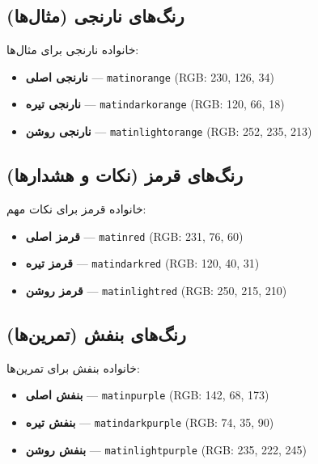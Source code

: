 \documentclass{matinbook}
\begin{document}
\subsection{رنگ‌های نارنجی (مثال‌ها)}

خانواده نارنجی برای مثال‌ها:

\begin{itemize}
    \item \textcolor{matinorange}{\textbf{نارنجی اصلی}} --- \texttt{matinorange} (RGB: 230, 126, 34)
    \item \textcolor{matindarkorange}{\textbf{نارنجی تیره}} --- \texttt{matindarkorange} (RGB: 120, 66, 18)
    \item \colorbox{matinlightorange}{\textbf{نارنجی روشن}} --- \texttt{matinlightorange} (RGB: 252, 235, 213)
\end{itemize}

\subsection{رنگ‌های قرمز (نکات و هشدارها)}

خانواده قرمز برای نکات مهم:

\begin{itemize}
    \item \textcolor{matinred}{\textbf{قرمز اصلی}} --- \texttt{matinred} (RGB: 231, 76, 60)
    \item \textcolor{matindarkred}{\textbf{قرمز تیره}} --- \texttt{matindarkred} (RGB: 120, 40, 31)
    \item \colorbox{matinlightred}{\textbf{قرمز روشن}} --- \texttt{matinlightred} (RGB: 250, 215, 210)
\end{itemize}

\subsection{رنگ‌های بنفش (تمرین‌ها)}

خانواده بنفش برای تمرین‌ها:

\begin{itemize}
    \item \textcolor{matinpurple}{\textbf{بنفش اصلی}} --- \texttt{matinpurple} (RGB: 142, 68, 173)
    \item \textcolor{matindarkpurple}{\textbf{بنفش تیره}} --- \texttt{matindarkpurple} (RGB: 74, 35, 90)
    \item \colorbox{matinlightpurple}{\textbf{بنفش روشن}} --- \texttt{matinlightpurple} (RGB: 235, 222, 245)
\end{itemize}
\end{document}
